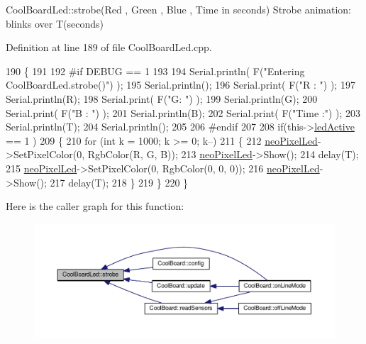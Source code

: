 Cool\+Board\+Led\+::strobe(\+Red , Green , Blue , Time in seconds) Strobe animation\+: blinks over T(seconds) 

Definition at line 189 of file Cool\+Board\+Led.\+cpp.


\begin{DoxyCode}
190 \{
191 
192 \textcolor{preprocessor}{#if DEBUG == 1}
193 
194     Serial.println( F(\textcolor{stringliteral}{"Entering CoolBoardLed.strobe()"}) );
195     Serial.println();
196     Serial.print( F(\textcolor{stringliteral}{"R : "}) );
197     Serial.println(R);
198     Serial.print( F(\textcolor{stringliteral}{"G: "}) );
199     Serial.println(G);
200     Serial.print( F(\textcolor{stringliteral}{"B : "}) );
201     Serial.println(B);
202     Serial.print( F(\textcolor{stringliteral}{"Time :"}) );
203     Serial.println(T);
204     Serial.println();
205 
206 \textcolor{preprocessor}{#endif  }
207 
208     \textcolor{keywordflow}{if}(this->\hyperlink{class_cool_board_led_aadd04d2ecf123247718d77f42fba7f08}{ledActive} == 1 )
209     \{   
210         \textcolor{keywordflow}{for} (\textcolor{keywordtype}{int} k = 1000; k >= 0; k--) 
211         \{
212             \hyperlink{class_cool_board_led_ac2c13fa462a010cd9242bf297c013923}{neoPixelLed}->SetPixelColor(0, RgbColor(R, G, B));
213             \hyperlink{class_cool_board_led_ac2c13fa462a010cd9242bf297c013923}{neoPixelLed}->Show();
214             delay(T);
215             \hyperlink{class_cool_board_led_ac2c13fa462a010cd9242bf297c013923}{neoPixelLed}->SetPixelColor(0, RgbColor(0, 0, 0));
216             \hyperlink{class_cool_board_led_ac2c13fa462a010cd9242bf297c013923}{neoPixelLed}->Show();
217             delay(T);
218         \}
219     \}
220 \}
\end{DoxyCode}
Here is the caller graph for this function\+:\nopagebreak
\begin{figure}[H]
\begin{center}
\leavevmode
\includegraphics[width=350pt]{de/dc0/class_cool_board_led_ad5f0de4c628cbfbf49896042831c64ad_icgraph}
\end{center}
\end{figure}
\mbox{\label{class_cool_board_led_a30fadd4cbec17ceea428bf7a32207e87}} 
